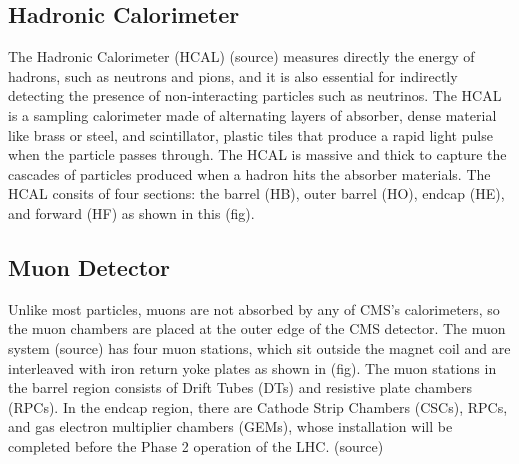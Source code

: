 \subsection{Hadronic Calorimeter}
The Hadronic Calorimeter (HCAL) (source) measures directly the energy of hadrons, such as neutrons and pions, and it is also essential for indirectly detecting the presence of non-interacting particles such as neutrinos.
The HCAL is a sampling calorimeter made of alternating layers of absorber, dense material like brass or steel, and scintillator, plastic tiles that produce a rapid light pulse when the particle passes through.
The HCAL is massive and thick to capture the cascades of particles produced when a hadron hits the absorber materials.
The HCAL consits of four sections: the barrel (HB), outer barrel (HO), endcap (HE), and forward (HF) as shown in this (fig).

\subsection{Muon Detector}
Unlike most particles, muons are not absorbed by any of CMS’s calorimeters, so the muon chambers are placed at the outer edge of the CMS detector.
The muon system (source) has four muon stations, which sit outside the magnet coil and are interleaved with iron return yoke plates as shown in (fig).
The muon stations in the barrel region consists of Drift Tubes (DTs) and resistive plate chambers (RPCs).
In the endcap region, there are Cathode Strip Chambers (CSCs), RPCs, and gas electron multiplier chambers (GEMs), whose installation will be completed before the Phase 2 operation of the LHC. (source)

